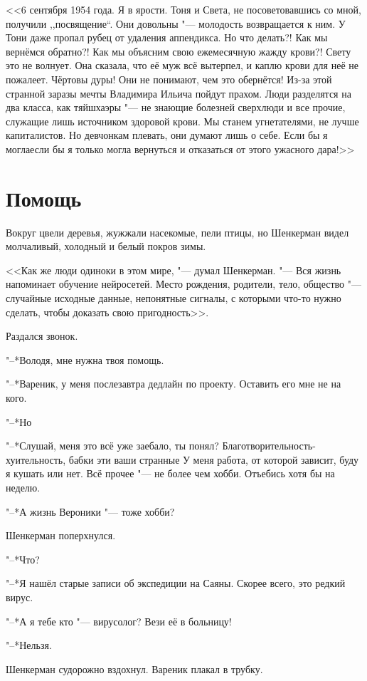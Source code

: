 <<6 сентября 1954 года.
Я в ярости.
Тоня и Света, не посоветовавшись со мной, получили ,,посвящение``.
Они довольны "--- молодость возвращается к ним.
У Тони даже пропал рубец от удаления аппендикса.
Но что делать?!
Как мы вернёмся обратно?!
Как мы объясним свою ежемесячную жажду крови?!
Свету это не волнует.
Она сказала, что её муж всё вытерпел, и каплю крови для неё не пожалеет.
Чёртовы дуры!
Они не понимают, чем это обернётся!
Из-за этой странной заразы мечты Владимира Ильича пойдут прахом.
Люди разделятся на два класса, как тяйшхаэры "--- не знающие болезней сверхлюди и все прочие, служащие лишь источником здоровой крови.
Мы станем угнетателями, не лучше капиталистов.
Но девчонкам плевать, они думают лишь о себе.
Если бы я могла\ldotst если бы я только могла вернуться и отказаться от этого ужасного дара!>>

\section{Помощь}

Вокруг цвели деревья, жужжали насекомые, пели птицы, но Шенкерман видел молчаливый, холодный и белый покров зимы.

<<Как же люди одиноки в этом мире, "--- думал Шенкерман.
"--- Вся жизнь напоминает обучение нейросетей.
Место рождения, родители, тело, общество "--- случайные исходные данные, непонятные сигналы, с которыми что-то нужно сделать, чтобы доказать свою пригодность>>.

Раздался звонок.

"--*Володя, мне нужна твоя помощь.

"--*Вареник, у меня послезавтра дедлайн по проекту.
Оставить его мне не на кого.

"--*Но\ldotst

"--*Слушай, меня это всё уже заебало, ты понял?
Благотворительность-хуительность, бабки эти ваши странные\ldotst
У меня работа, от которой зависит, буду я кушать или нет.
Всё прочее "--- не более чем хобби.
Отъебись хотя бы на неделю.

"--*А жизнь Вероники "--- тоже хобби?

Шенкерман поперхнулся.

"--*Что?

"--*Я нашёл старые записи об экспедиции на Саяны.
Скорее всего, это редкий вирус.

"--*А я тебе кто "--- вирусолог?
Вези её в больницу!

"--*Нельзя.

Шенкерман судорожно вздохнул.
Вареник плакал в трубку.

